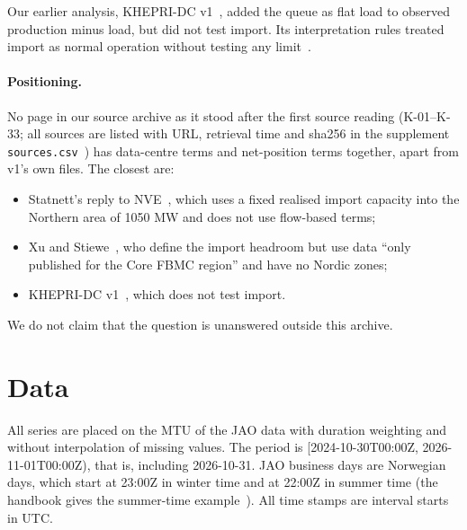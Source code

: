 Our earlier analysis, KHEPRI-DC v1~\cite{v1}, added the queue as flat load to observed production minus load, but did not test import. %
Its interpretation rules treated import as normal operation without testing any limit~\cite{v1}. %

\paragraph{Positioning.}
No page in our source archive as it stood after the first source reading (K-01--K-33; all sources are listed with URL, retrieval time and sha256 in the supplement \texttt{sources.csv}~\cite{sources}) has data-centre terms and net-position terms together, apart from v1's own files. %
The closest are:
\begin{itemize}
\item Statnett's reply to NVE~\cite{statnettbrev}, which uses a fixed realised import capacity into the Northern area of 1050 MW and does not use flow-based terms; %
\item Xu and Stiewe~\cite{xu}, who define the import headroom but use data ``only published for the Core FBMC region'' and have no Nordic zones; %
\item KHEPRI-DC v1~\cite{v1}, which does not test import. %
\end{itemize}
We do not claim that the question is unanswered outside this archive.

\section{Data}
\label{sec:data}

All series are placed on the MTU of the JAO data with duration weighting and without interpolation of missing values. %
The period is [2024-10-30T00:00Z, 2026-11-01T00:00Z), that is, including 2026-10-31. %
JAO business days are Norwegian days, which start at 23:00Z in winter time and at 22:00Z in summer time (the handbook gives the summer-time example~\cite{jaohb}). %
All time stamps are interval starts in UTC. %

